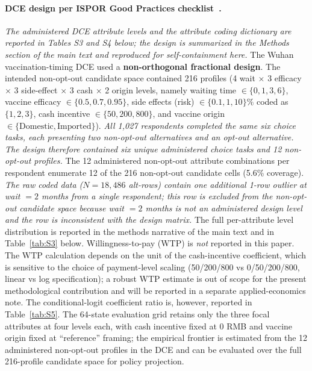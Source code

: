 \documentclass[11pt]{article}
\begin{document}
\paragraph{DCE design per ISPOR Good Practices checklist~\citep{Johnson2013DCE, Hauber2016DCE, Bridges2013DCE}.} \emph{The administered DCE attribute levels and the attribute coding dictionary are reported in Tables S3 and S4 below; the design is summarized in the Methods section of the main text and reproduced for self-containment here.} The Wuhan vaccination-timing DCE used a \textbf{non-orthogonal fractional design}. The intended non-opt-out candidate space contained 216 profiles (4 wait $\times$ 3 efficacy $\times$ 3 side-effect $\times$ 3 cash $\times$ 2 origin levels, namely waiting time $\in \{0, 1, 3, 6\}$, vaccine efficacy $\in \{0.5, 0.7, 0.95\}$, side effects (risk) $\in \{0.1, 1, 10\}\%$ coded as $\{1, 2, 3\}$, cash incentive $\in \{50, 200, 800\}$, and vaccine origin $\in \{\text{Domestic}, \text{Imported}\}$). \emph{All 1,027 respondents completed the same six choice tasks, each presenting two non-opt-out alternatives and an opt-out alternative. The design therefore contained six unique administered choice tasks and 12 non-opt-out profiles.} The 12 administered non-opt-out attribute combinations per respondent enumerate 12 of the 216 non-opt-out candidate cells (5.6\% coverage). \emph{The raw coded data ($N=18{,}486$ alt-rows) contain one additional 1-row outlier at wait $= 2$ months from a single respondent; this row is excluded from the non-opt-out candidate space because wait $= 2$ months is not an administered design level and the row is inconsistent with the design matrix.} The full per-attribute level distribution is reported in the methods narrative of the main text and in Table~\ref{tab:S3} below. Willingness-to-pay (WTP) is \emph{not} reported in this paper. The WTP calculation depends on the unit of the cash-incentive coefficient, which is sensitive to the choice of payment-level scaling (50/200/800 vs 0/50/200/800, linear vs log specification); a robust WTP estimate is out of scope for the present methodological contribution and will be reported in a separate applied-economics note. The conditional-logit coefficient ratio is, however, reported in Table~\ref{tab:S5}. The 64-state evaluation grid retains only the three focal attributes at four levels each, with cash incentive fixed at 0 RMB and vaccine origin fixed at ``reference'' framing; the empirical frontier is estimated from the 12 administered non-opt-out profiles in the DCE and can be evaluated over the full 216-profile candidate space for policy projection.
\end{document}
